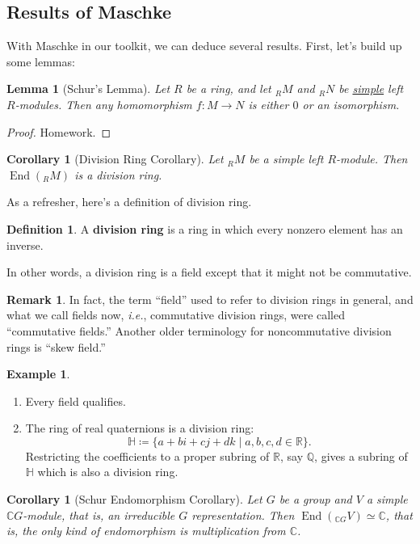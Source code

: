 \documentclass[12pt]{article}
\newcommand{\q}{\mathbb{Q}}
\newcommand{\cx}{\mathbb{C}}
\newcommand{\real}{\mathbb{R}}
\newcommand{\ita}[1]{\textit{#1}}
\newtheorem{corollary}[theorem]{Corollary}
\newtheorem{lemma}[theorem]{Lemma}
\theoremstyle{definition}
\newtheorem{definition}[theorem]{Definition}
\newtheorem*{remark}{Remark}
\newtheorem{example}{Example}[section]
\DeclareMathOperator\End{End}
\begin{document}
\subsection{Results of Maschke}
With Maschke in our toolkit, we can deduce several results. First, let's build up some lemmas:
\begin{lemma}[Schur's Lemma]
    Let $R$ be a ring, and let $_RM$ and $_RN$ be \underline{simple} left $R$-modules. Then any homomorphism $f:M\to N$ is either $0$ or an isomorphism.
\end{lemma}
\begin{proof}
    Homework.
\end{proof}
\begin{corollary}[Division Ring Corollary]
    Let $_RM$ be a simple left $R$-module. Then $\End(_RM)$ is a division ring.
\end{corollary}
As a refresher, here's a definition of division ring.
\begin{definition}
    A \textbf{division ring} is a ring in which every nonzero element has an inverse.
\end{definition}
In other words, a division ring is a field except that it might not be commutative. 
\begin{remark}
    In fact, the term ``field'' used to refer to division rings in general, and what we call fields now, \ita{i.e.}, commutative division rings, were called ``commutative fields.'' Another older terminology for noncommutative division rings is ``skew field.''
\end{remark}
\begin{example}
    \noindent
    \begin{enumerate}
        \item Every field qualifies.
        \item The ring of real quaternions is a division ring:
        \begin{equation}
            \mathbb{H}\coloneqq \{a+bi+cj+dk\mid a,b,c,d\in\real\}.
        \end{equation}
        Restricting the coefficients to a proper subring of $\real$, say $\q$, gives a subring of $\mathbb{H}$ which is also a division ring.
    \end{enumerate}
\end{example}
\begin{corollary}[Schur Endomorphism Corollary]
    Let $G$ be a group and $V$ a simple $\cx G$-module, that is, an irreducible $G$ representation. Then $\End(_{\cx G}V)\simeq\cx$, that is, the only kind of endomorphism is multiplication from $\cx$.
\end{corollary}
\end{document}
